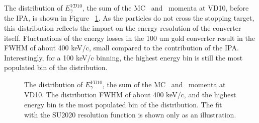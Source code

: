 The distribution of $E_\gamma^{VD10}$, the sum of the MC \eplus\ and \eminus\ momenta at VD10,
before the IPA, is shown in Figure ~\ref{figure:00086}. As the particles do not cross the
stopping target, this distribution reflects the impact on the energy resolution
of the converter itself.
%
Fluctuations of the energy losses in the 100 um gold converter result
in the FWHM of about 400 keV/c, small compared to the contribution of the IPA.
Interestingly, for a 100 keV/c binning, the highest energy bin is still
the most populated bin of the distribution.

\begin{figure}[H]
  \caption{
    \label{figure:00086}
    The distribution of $E_\gamma^{VD10}$, the sum of the MC \eplus\ and \eminus\ momenta at VD10.
    The distribution FWHM of about 400 keV/c, and the highest energy bin is the most populated
    bin of the distribution.
    The fit with the SU2020 resolution function is shown only as an illustration.
  }
\end{figure}

